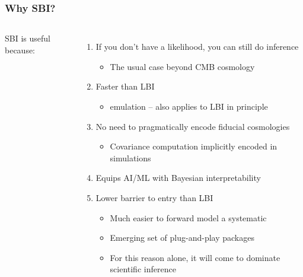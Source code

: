 \documentclass[aspectratio=169]{beamer}
\begin{document}
\begin{frame}
    \frametitle{Why SBI?}
    \begin{columns}
        SBI is useful because:
        \begin{enumerate}
            \item If you don't have a likelihood, you can still do inference
                \begin{itemize}
                    \item The usual case beyond CMB cosmology
                \end{itemize}
            \item Faster than LBI
                \begin{itemize}
                    \item emulation -- also applies to LBI in principle
                \end{itemize}
            \item No need to pragmatically encode fiducial cosmologies
                \begin{itemize}
                    \item Covariance computation implicitly encoded in simulations
                \end{itemize}
            \item Equips AI/ML with Bayesian interpretability
            \item Lower barrier to entry than LBI
                \begin{itemize}
                    \item Much easier to forward model a systematic
                    \item Emerging set of plug-and-play packages
                    \item For this reason alone, it will come to dominate scientific inference
                \end{itemize}
        \end{enumerate}


\end{columns}
\end{frame}
\end{document}
